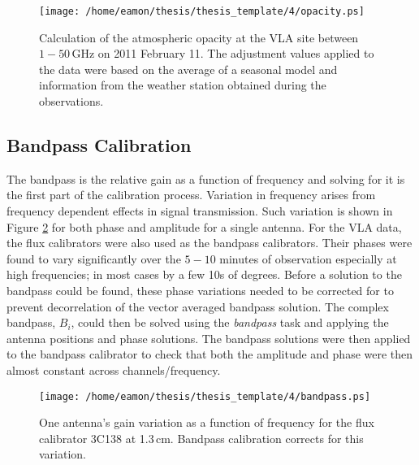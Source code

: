 \begin{figure}[hbt!]
\centering 
\texttt{[image: /home/eamon/thesis/thesis\_template/4/opacity.ps]}  
\caption[Atmospheric opacity at the VLA site.]{Calculation of the atmospheric opacity at the VLA site between $1-50$\,GHz on 2011 February 11. The adjustment values applied to the data were based on the average of a seasonal model and information from the weather station obtained during the observations.}
\label{fig:4.5}
\end{figure}

\subsection{Bandpass Calibration}
The bandpass is the relative gain as a function of frequency and solving for it is the first part of the calibration process. Variation in frequency arises from frequency dependent effects in signal transmission. Such variation is shown in Figure \ref{fig:4.6} for both phase and amplitude for a single antenna. For the VLA data, the flux calibrators were also used as the bandpass calibrators. Their phases were found to vary significantly over the $5-10$ minutes of observation especially at high frequencies; in most cases by a few 10s of degrees. Before a solution to the bandpass could be found, these phase variations needed to be corrected for to prevent decorrelation of the vector averaged bandpass solution. The complex bandpass, $B_i$, could then be solved using the \textit{bandpass} task and applying the antenna positions and phase solutions. The bandpass solutions  were then applied to the bandpass calibrator to check that both the amplitude and phase were then almost constant across channels/frequency.

\begin{figure}[hbt!]
\centering 
\texttt{[image: /home/eamon/thesis/thesis\_template/4/bandpass.ps]}  
\caption[Gain variation as a function of frequency.]{One antenna's gain variation as a function of frequency for the flux calibrator 3C138 at 1.3\,cm. Bandpass calibration corrects for this variation.}
\label{fig:4.6}
\end{figure}

